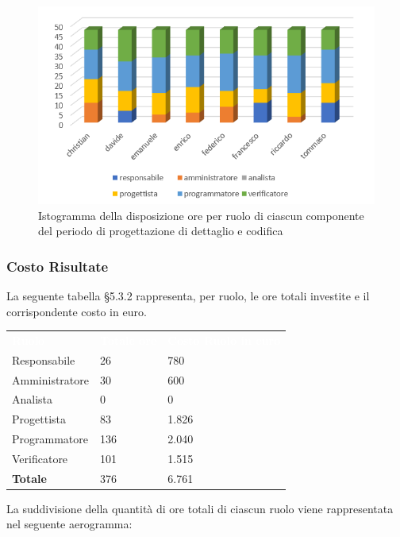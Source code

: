 \begin{figure}[h]
	\centering
	\includegraphics[scale=2]{sezioni/Istogrammi/IstogrammaDiDettaglio.png}
	\caption{Istogramma della disposizione ore per ruolo di ciascun componente del periodo di progettazione di dettaglio e codifica}
\end{figure}

\subsubsection{Costo Risultate}
La seguente tabella §5.3.2 rappresenta, per ruolo, le ore totali investite e il corrispondente costo in euro.
{
	\renewcommand{\arraystretch}{2}
	\centering
	\begin{longtable}{ C{3cm} C{2cm} C{4cm}}
		\textcolor{white}{\textbf{Ruolo}} & \textcolor{white}{\textbf{Totale ore}} & \textcolor{white}{\textbf{Costo Ruolo in euro}}\\	
        
        Responsabile & 26 & 780 \\
        Amministratore & 30 & 600 \\
        Analista & 0 & 0 \\
        Progettista & 83 & 1.826 \\
        Programmatore & 136 & 2.040 \\
        Verificatore & 101 & 1.515\\
        \textbf{Totale} & 376 & 6.761 \\
		
	\end{longtable}
}

La suddivisione della quantità di ore totali di ciascun ruolo viene rappresentata nel seguente aerogramma:

